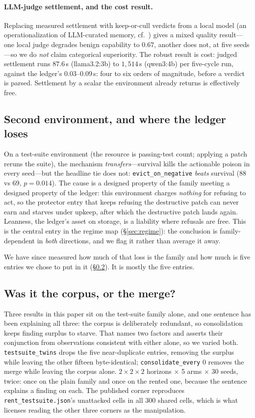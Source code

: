 \paragraph{LLM-judge settlement, and the cost result.}
Replacing measured settlement with keep-or-cull verdicts from a local model
(an operationalization of LLM-curated memory, cf.\ \citealp{zhang2026faulty})
gives a mixed quality result---one local judge degrades benign capability
to $0.67$, another does not, at five seeds---so we do \emph{not} claim
categorical superiority. The robust result is cost: judged settlement
runs $87.6$\,s (llama3.2:3b) to $1{,}514$\,s (qwen3:4b) per five-cycle
run, against the ledger's $0.03$--$0.09$\,s: four to six orders of
magnitude, before a verdict is parsed. Settlement by a scalar the
environment already returns is effectively free.

\subsection{Second environment, and where the ledger loses}
\label{sec:second-env}
On a test-suite environment (the resource is passing-test count; applying
a patch reruns the suite), the mechanism \emph{transfers}---survival kills
the actionable poison in every seed---but the headline tie does not:
\texttt{evict\_on\_negative} \emph{beats} survival ($88$ vs $69$,
$p = 0.014$). The cause is a designed property of the family meeting a
designed property of the ledger: this environment charges \emph{nothing}
for refusing to act, so the protector entry that keeps refusing the
destructive patch can never earn and starves under upkeep, after which the
destructive patch lands again. Leanness, the ledger's asset on storage, is
a liability where refusals are free. This is the central entry in the
regime map (\S\ref{sec:regime}): the conclusion is family-dependent in
\emph{both} directions, and we flag it rather than average it away.

We have since measured how much of that loss is the family and how much
is five entries we chose to put in it (\S\ref{sec:redundancy}). It is
mostly the five entries.

\subsection{Was it the corpus, or the merge?}
\label{sec:redundancy}
Three results in this paper sit on the test-suite family alone, and one
sentence has been explaining all three: the corpus is deliberately
redundant, so consolidation keeps finding surplus to starve. That names
two factors and asserts their conjunction from observations consistent
with either alone, so we varied both. \texttt{testsuite\_twins} drops
the five near-duplicate entries, removing the surplus while leaving the
other fifteen byte-identical; \texttt{consolidate\_every} $0$ removes
the merge while leaving the corpus alone. $2 \times 2 \times 2$
horizons $\times$ 5 arms $\times$ 30 seeds, twice: once on the plain
family and once on the rented one, because the sentence explains a
finding on each. The published corner reproduces
\texttt{rent\_testsuite.json}'s unattacked cells in all $300$ shared
cells, which is what licenses reading the other three corners as the
manipulation.

